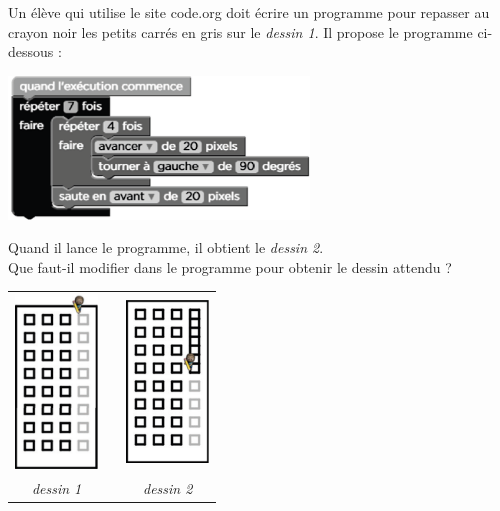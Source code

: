 \pagebreak


\begin{exercice}[CRPE 2018 G3] %
   Un élève qui utilise le site \og code.org \fg{} doit écrire un programme pour repasser au crayon noir les petits carrés en gris sur le {\it dessin 1}.
Il propose le programme ci-dessous :
   \begin{center}
      \includegraphics[width=8cm]{Transversal/Images/T15_ex_prog}
   \end{center}
   Quand il lance le programme, il obtient le {\it dessin 2}. \\
   Que faut-il modifier dans le programme pour obtenir le dessin attendu ?
   \begin{center}
      \begin{tabular}{cC{2.5}c}
         \includegraphics[width=2.2cm]{Transversal/Images/T15_ex_dessinf}
         &
         &
         \includegraphics[width=2.2cm]{Transversal/Images/T15_ex_dessini} \\
         {\it dessin 1}
         &
         &
         {\it dessin 2} \\
      \end{tabular}
   \end{center}
\end{exercice}

